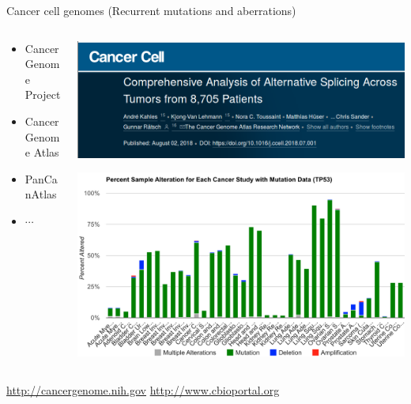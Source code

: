 \documentclass[10pt]{beamer}
\begin{document}
\begin{frame}{Cancer cell genomes (Recurrent mutations and aberrations)}
	\begin{columns}
		\begin{column}{0.3\textwidth}
			\begin{itemize}
				\item  Cancer Genome Project 
				\item  Cancer Genome Atlas 
				\item  PanCanAtlas
				\item $\cdots$
			\end{itemize}
		\end{column}
		\begin{column}{0.7\textwidth}
			\begin{center}
				\includegraphics[width=\textwidth]{./figures/canceraltsplicing.png}
			\end{center}
			\begin{center}
				\includegraphics[width=\textwidth]{./figures/p53.png}
			\end{center}
		\end{column}
	\end{columns}
	\href{https://www.cancer.gov/ccg/research/genome-sequencing/tcga}{http://cancergenome.nih.gov} \hfill \url{http://www.cbioportal.org} 
\end{frame}
\end{document}
